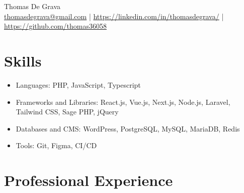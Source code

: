 \documentclass[11pt, a4paper]{article}
\begin{document}
\begin{center}
    {\Huge Thomas De Grava}\\
    \vspace{0.2cm}
    \href{mailto:thomasdegrava@gmail.com}{thomasdegrava@gmail.com} | 
    \href{https://www.linkedin.com/in/thomasdegrava/}{https://linkedin.com/in/thomasdegrava/} | 
    \href{https://www.github.com/thomas36058}{https://github.com/thomas36058}
\end{center}

\section*{Skills}
\begin{itemize}
    \item Languages: PHP, JavaScript, Typescript
    \item Frameworks and Libraries: React.js, Vue.js, Next.js, Node.js, Laravel, Tailwind CSS, Sage PHP, jQuery
    \item Databases and CMS: WordPress, PostgreSQL, MySQL, MariaDB, Redis
    \item Tools: Git, Figma, CI/CD
\end{itemize}

\section*{Professional Experience}
\end{document}

